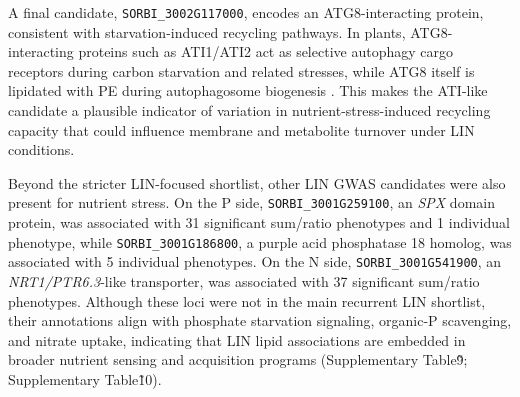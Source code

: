 \documentclass[9pt,twocolumn,twoside]{rilabRxiv}
\begin{document}
A final candidate, \texttt{SORBI\_3002G117000}, encodes an ATG8-interacting protein, consistent with starvation-induced recycling pathways. In plants, ATG8-interacting proteins such as ATI1/ATI2 act as selective autophagy cargo receptors during carbon starvation and related stresses, while ATG8 itself is lipidated with PE during autophagosome biogenesis \citep{Honig2012,Wu2021ATI,Michaeli2014}. This makes the ATI-like candidate a plausible indicator of variation in nutrient-stress-induced recycling capacity that could influence membrane and metabolite turnover under LIN conditions.

Beyond the stricter LIN-focused shortlist, other LIN GWAS candidates were also present for nutrient stress. On the P side, \texttt{SORBI\_3001G259100}, an \textit{SPX} domain protein, was associated with 31 significant sum/ratio phenotypes and 1 individual phenotype, while \texttt{SORBI\_3001G186800}, a purple acid phosphatase 18 homolog, was associated with 5 individual phenotypes. On the N side, \texttt{SORBI\_3001G541900}, an \textit{NRT1/PTR6.3}-like transporter, was associated with 37 significant sum/ratio phenotypes. Although these loci were not in the main recurrent LIN shortlist, their annotations align with phosphate starvation signaling, organic-P scavenging, and nitrate uptake, indicating that LIN lipid associations are embedded in broader nutrient sensing and acquisition programs (Supplementary Table\~9; Supplementary Table\~10).




\end{document}
